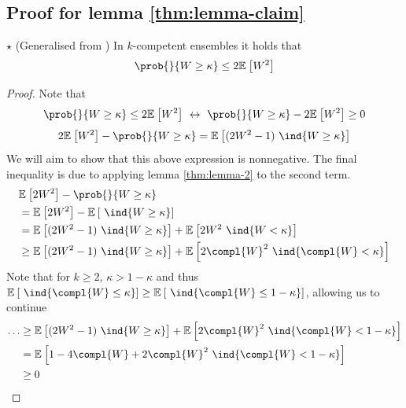 \documentclass[
	twoside=false, %
]{kaobook}
\begin{document}
\subsection{Proof for lemma \ref{thm:lemma-claim}}
\label{sec:proof-lemma-claim}

\begin{lemma} $\star$ (Generalised from \cite{theisen_WhenAreEnsembles_2023}) In $k$-competent ensembles it holds that
$$
\prob{}{W \geq \kappa} \leq 2 \mathbb{E}_{}\left[ W^2 \right] 
$$
\end{lemma}
\begin{proof}
Note that
$$
\prob{}{W \geq \kappa} \leq 2 \mathbb{E}_{}\left[ W^2 \right] ~\leftrightarrow~ 
\prob{}{W \geq \kappa} - 2 \mathbb{E}_{}\left[ W^2 \right] \geq 0
$$
$$
2\mathbb{E}_{}\left[ W^2 \right] - \prob{}{W \geq \kappa} = 
\mathbb{E}_{}\left[ (2W^2-1)~\ind{W \geq \kappa} \right]
$$
We will aim to show that this above expression is nonnegative.
The  final inequality is due to applying lemma \ref{thm:lemma-2} to the second term.
\begin{align*}
& \mathbb{E}_{}\left[ 2W^2 \right]  - \prob{}{W \geq \kappa}  \\
&= \mathbb{E}_{}\left[ 2W^2 \right]  - \mathbb{E}_{}\left[ ~\ind{W \geq \kappa} \right]  \\
&= \mathbb{E}_{}\left[ (2W^2 - 1) ~\ind{W \geq \kappa} \right]  + \mathbb{E}_{}\left[ 2W^2 ~\ind{W < \kappa} \right] \\
& \geq  \mathbb{E}_{}\left[ (2W^2 - 1) ~\ind{W \geq \kappa} \right]  + \mathbb{E}_{}\left[ 2\compl{W} ^2 ~\ind{\compl{W}  < \kappa} \right] 
\end{align*}
Note that for $k \geq 2$, $\kappa > 1-\kappa$ and thus $\mathbb{E}_{}\left[ ~\ind{\compl{W} \leq \kappa} \right] \geq \mathbb{E}_{}\left[ ~\ind{\compl{W} \leq 1 - \kappa} \right]$, allowing us to continue
\begin{align*}
\dots &\geq 
\mathbb{E}_{}\left[ (2W^2 - 1) ~\ind{W \geq \kappa} \right]  + \mathbb{E}_{}\left[ 2\compl{W} ^2 ~\ind{\compl{W}  < 1-\kappa} \right]  \\
&= \mathbb{E}_{}\left[ 1-4 \compl{W} + 2 \compl{W}^2 ~\ind{\compl{W} < 1-\kappa }  \right]  \\
& \geq 0
\end{align*}
\end{proof}
\end{document}

